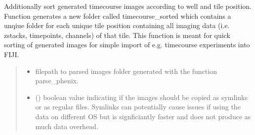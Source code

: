 \documentclass[a4paper,10pt,english,openany,oneside]{sphinxmanual}
\begin{document}

\begin{fulllineitems}
\label{\detokenize{pages/modules:sparcstools.parse.sort_timepoints}}
\pysigstartsignatures
{}
\pysigstopsignatures
\sphinxAtStartPar
Additionally sort generated timecourse images according to well and tile position. Function
generates a new folder called timecourse\_sorted which contains a unqiue folder for each unique tile
position containing all imaging data (i.e. zstacks, timepoints, channels) of that tile.
This function is meant for quick sorting of generated images for simple import of e.g. timecourse
experiments into FIJI.
\begin{quote}\begin{description}
\begin{itemize}
\item {} 
\sphinxAtStartPar
{} \textendash{} filepath to parsed images folder generated with the function parse\_phenix.

\item {} 
\sphinxAtStartPar
{} () \textendash{} boolean value indicating if the images should be copied as symlinks or as regular files. Symlinks can potentially cause issues if using the data on
different OS but is signficiantly faster and does not produce as much data overhead.

\end{itemize}

\end{description}\end{quote}

\end{fulllineitems}

\end{document}
